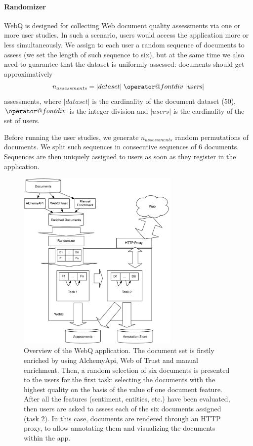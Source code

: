 \documentclass{llncs}
\makeatletter
\newcommand*{\bdiv}{%
  \nonscript\mskip-\medmuskip\mkern5mu%
  \mathbin{\operator@font div}\penalty900\mkern5mu%
  \nonscript\mskip-\medmuskip
}
\makeatother
\begin{document}
\paragraph{Randomizer}
WebQ is designed for collecting Web document quality assessments via one or more user studies. In such a scenario, users would access the application more or less simultaneously. We assign to each user a random sequence of documents to assess (we set the length of such sequence to six), but at the same time we also need to guarantee that the dataset is uniformly assessed: documents should get approximatively $$ n_{assessments} = |dataset |  \bdiv | {\it users} | $$ assessments, where $| dataset|$ is the cardinality of the document dataset (50), $\bdiv$ is the integer division and $| {users}|$ is the cardinality of the set of users. 

Before running the user studies, we generate $n_{assessments}$ random permutations of documents. We split such sequences in consecutive sequences of 6 documents. Sequences are then uniquely assigned to users as soon as they register in the application.

\begin{figure}
\centering
\includegraphics[width=0.70\textwidth]{overview.pdf}
\caption{Overview of the WebQ application. The document set is firstly enriched by using AlchemyApi, Web of Trust and manual enrichment. Then, a random selection of six documents is presented to the users for the first task: selecting the documents with the highest quality on the basis of the value of one document feature. After all the features (sentiment, entities, etc.) have been evaluated, then users are asked to assess each of the six documents assigned (task 2). In this case, documents are rendered through an HTTP proxy, to allow annotating them and visualizing the documents within the app.\label{fig:overview}}
\end{figure}
\end{document}
